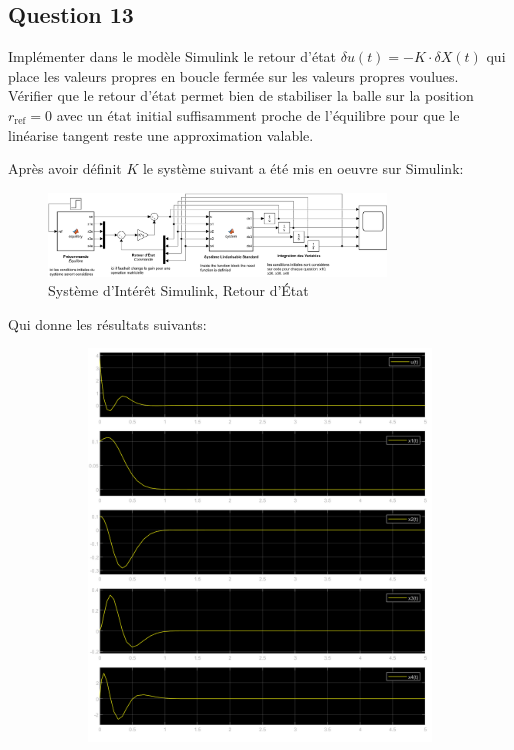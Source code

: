 \documentclass[class=article, crop=false]{standalone}
\begin{document}
\newpage
\subsection{Question 13}
\begin{exercise}
    Implémenter dans le modèle Simulink le retour d'état  $\delta u(t) = -K \cdot \delta X(t)$ qui place les valeurs propres en boucle fermée sur les valeurs propres voulues.\\
    
Vérifier que le retour d'état permet bien de stabiliser la balle sur la position $r_{\text{ref}} = 0$ avec un état initial suffisamment proche de l'équilibre pour que le linéarise tangent reste une approximation valable.
\end{exercise}
\begin{resolution}
    Après avoir définit $K$ le système suivant a été mis en oeuvre sur Simulink:
    \begin{figure}[H]
        \centering
        \includegraphics[width=0.8\textwidth]{../images/system_simulink_3.png}
        \caption{Système d'Intérêt Simulink, Retour d'État}
    \end{figure}
    Qui donne les résultats suivants:
    \begin{figure}[H]
        \centering
        \begin{subfigure}[b]{0.475\textwidth}
            \centering
            \includegraphics[width=\textwidth]{../images/simulink_scope3_0_01.png}

\end{subfigure}
\end{figure}
\end{resolution}
\end{document}
